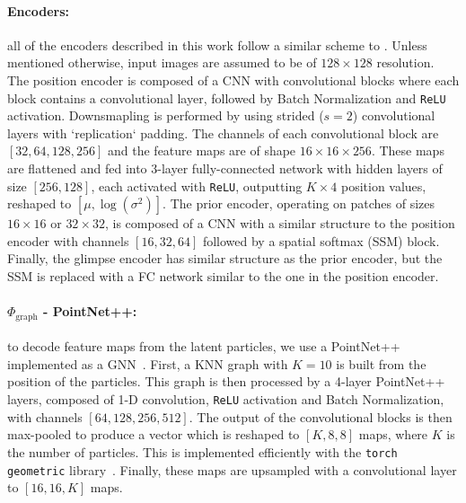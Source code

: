 \documentclass[nohyperref]{article}
\theoremstyle{plain}
\theoremstyle{definition}
\theoremstyle{remark}
\newcommand{\dgraph}{\Phi_{\textrm{graph}}}
\begin{document}
\paragraph{Encoders:} all of the encoders described in this work follow a similar scheme to \citet{jakab2018unsupervised}. Unless mentioned otherwise, input images are assumed to be of $128\times128$ resolution. The position encoder is composed of a CNN with convolutional blocks where each block contains a convolutional layer, followed by Batch Normalization and \texttt{ReLU} activation. Downsmapling is performed by using strided ($s=2$) convolutional layers with `replication` padding. The channels of each convolutional block are $[32, 64, 128, 256]$ and the feature maps are of shape $16\times16\times 256$. These maps are flattened and fed into 3-layer fully-connected network with hidden layers of size $[256, 128]$, each activated with \texttt{ReLU}, outputting $K\times4$ position values, reshaped to $[\mu, \log(\sigma^2)]$. The prior encoder, operating on patches of sizes $16\times16$ or $32\times32$, is composed of a CNN with a similar structure to the position encoder with channels $[16, 32, 64]$ followed by a spatial softmax (SSM) block. Finally, the glimpse encoder has similar structure as the prior encoder, but the SSM is replaced with a FC network similar to the one in the position encoder.

\paragraph{$\dgraph$ - PointNet++:} to decode feature maps from the latent particles, we use a PointNet++~\citep{qi2017pointnet++} implemented as a GNN~\cite{gnn09}. First, a KNN graph with $K=10$ is built from the position of the particles. This graph is then processed by a 4-layer PointNet++ layers, composed of 1-D convolution, \texttt{ReLU} activation and Batch Normalization, with channels $[64, 128, 256, 512]$. The output of the convolutional blocks is then max-pooled to produce a vector which is reshaped to $[K, 8, 8]$ maps, where $K$ is the number of particles. This is implemented efficiently with the \texttt{torch geometric} library~\citep{feylensen19tgeom}. Finally, these maps are upsampled with a convolutional layer to $[16, 16, K]$ maps.
\end{document}
